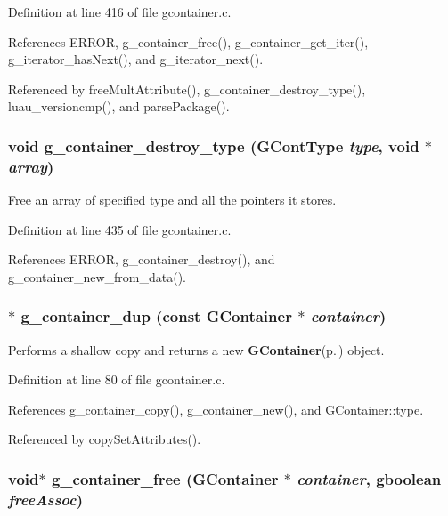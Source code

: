 Definition at line 416 of file gcontainer.c.

References ERROR, g\_\-container\_\-free(), g\_\-container\_\-get\_\-iter(), g\_\-iterator\_\-has\-Next(), and g\_\-iterator\_\-next().

Referenced by free\-Mult\-Attribute(), g\_\-container\_\-destroy\_\-type(), luau\_\-versioncmp(), and parse\-Package().
\subsubsection{\setlength{\rightskip}{0pt plus 5cm}void g\_\-container\_\-destroy\_\-type ({\bf GCont\-Type} {\em type}, void $\ast$ {\em array})}\label{gcontainer_8h_a24}


Free an array of specified type and all the pointers it stores. 



Definition at line 435 of file gcontainer.c.

References ERROR, g\_\-container\_\-destroy(), and g\_\-container\_\-new\_\-from\_\-data().
\subsubsection{$\ast$ g\_\-container\_\-dup (const {\bf GContainer} $\ast$ {\em container})}\label{gcontainer_8h_a5}


Performs a shallow copy and returns a new {\bf GContainer}{\rm (p.\,\pageref{structGContainer})} object. 



Definition at line 80 of file gcontainer.c.

References g\_\-container\_\-copy(), g\_\-container\_\-new(), and GContainer::type.

Referenced by copy\-Set\-Attributes().
\subsubsection{\setlength{\rightskip}{0pt plus 5cm}void$\ast$ g\_\-container\_\-free ({\bf GContainer} $\ast$ {\em container}, gboolean {\em free\-Assoc})}\label{gcontainer_8h_a20}


